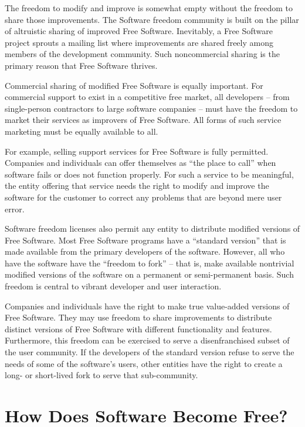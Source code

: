 The freedom to modify and improve is somewhat empty without the freedom to
share those improvements.  The Software freedom community is built on the
pillar of altruistic sharing of improved Free Software. Inevitably, a
Free Software project sprouts a mailing list where improvements are shared
freely among members of the development community.  Such noncommercial
sharing is the primary reason that Free Software thrives.

Commercial sharing of modified Free Software is equally important.
For commercial support to exist in a competitive free market, all
developers -- from single-person contractors to large software
companies -- must have the freedom to market their services as
improvers of Free Software.  All forms of such service marketing must
be equally available to all.

For example, selling support services for Free Software is fully
permitted. Companies and individuals can offer themselves as ``the place
to call'' when software fails or does not function properly.  For such a
service to be meaningful, the entity offering that service needs the
right to modify and improve the software for the customer to correct any
problems that are beyond mere user error.

Software freedom licenses also permit any entity to distribute modified
versions of Free Software.  Most Free Software programs have a ``standard
version'' that is made available from the primary developers of the software.
However, all who have the software have the ``freedom to fork'' -- that is,
make available nontrivial modified versions of the software on a permanent or
semi-permanent basis.  Such freedom is central to vibrant developer and user
interaction.

Companies and individuals have the right to make true value-added versions
of Free Software.  They may use freedom to share improvements to
distribute distinct versions of Free Software with different functionality
and features.  Furthermore, this freedom can be exercised to serve a
disenfranchised subset of the user community.  If the developers of the
standard version refuse to serve the needs of some of the software's
users, other entities have the right to create a long- or short-lived fork
to serve that sub-community.

\section{How Does Software Become Free?}

